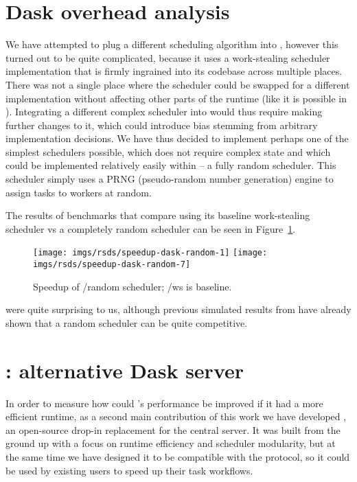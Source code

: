 \section{Dask overhead analysis}
\label{sec:rsds-dask-overhead}
We have attempted to plug a different scheduling algorithm into \dask{}, however
this turned out to be quite complicated, because it uses a work-stealing scheduler implementation
that is firmly ingrained into its codebase across multiple places. There was not a single place
where the scheduler could be swapped for a different implementation without affecting other parts
of the runtime (like it is possible in \estee{}). Integrating a different complex
scheduler into \dask{} would thus require making further changes to it, which could
introduce bias stemming from arbitrary implementation decisions. We have thus decided to implement
perhaps one of the simplest schedulers possible, which does not require complex state and which
could be implemented relatively easily within \dask{} -- a fully random scheduler.
This scheduler simply uses a PRNG (pseudo-random number generation) engine to assign tasks to
workers at random.

The results of benchmarks that compare \dask{} using its baseline work-stealing
scheduler vs a completely random scheduler can be seen in Figure~\ref{fig:dask-ws-vs-random}.

\begin{figure}
	\centering
	\texttt{[image: imgs/rsds/speedup-dask-random-1]}
	\texttt{[image: imgs/rsds/speedup-dask-random-7]}
	\caption{Speedup of \dask{}/random scheduler; \dask{}/ws is baseline.}
	\label{fig:dask-ws-vs-random}
\end{figure}

were quite surprising to us, although previous simulated results from \estee{} have
already shown that a random scheduler can be quite competitive.

\section{\rsds{}: alternative Dask server}
\label{sec:rsds:-alternative-dask-server}

In order to measure how could \dask{}'s performance be improved if it had a more
efficient runtime, as a second main contribution of this work we have developed
\rsds{}, an open-source drop-in replacement for the \dask{} central
server. It was built from the ground up with a focus on runtime efficiency
and scheduler modularity, but at the same time we have designed it to be compatible with the
\dask{} protocol, so it could be used by existing \dask{} users to
speed up their task workflows.

